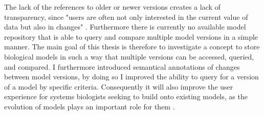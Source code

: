The lack of the references to older or newer versions creates a lack of transparency, since "users are often not only interested in the current value of data but also in changes" \citep{Cobena2002}. Furthermore there is currently no available model repository that is able to query and compare multiple model versions in a simple manner.
The main goal of this thesis is therefore to investigate a concept to store biological models in such a way that multiple versions can be accessed, queried, and compared. I furthermore introduced semantical annotations of changes between model versions, by doing so I improved the ability to query for a version of a model by specific criteria. Consequently it will also improve the user experience for systems biologists seeking to build onto existing models, as the evolution of models plays an important role for them \citep{Scharm2015}.

